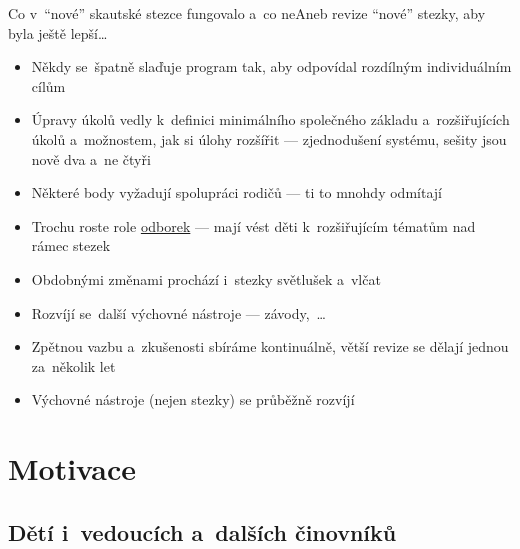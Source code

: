 \documentclass[compress, ucs, xelatex, 11pt, xcolor=dvipsnames, print, aspectratio=169,
	hyperref={
		bookmarks=true,
		unicode=true,
		colorlinks=true,
		pdftitle={Skautska vychovna metoda},
		plainpages=false,
		pdfauthor={Vojtech Zeisek},
		pdfsubject={Skautska vychovna metoda a jeji vyvoj za posledni stoleti a desetileti},
		pdfcreator={XeLaTeX},
		pdfkeywords={Junak, Pedagogika, Skaut, Skauting, Vychovna metoda},
		linkcolor=Red, %
		anchorcolor=ForestGreen, %
		citecolor=ForestGreen, %
		filecolor=ForestGreen, %
		menucolor=ForestGreen, %
		urlcolor=Sepia, %
		pdftex},
	url={hyphens, lowtilde} %
	]{beamer}
\begin{document}
\begin{frame}{Co v~\enquote{nové} skautské stezce fungovalo a~co ne}{Aneb revize \enquote{nové} stezky, aby byla ještě lepší\ldots}
	\begin{itemize}
		\item Někdy se~špatně slaďuje program tak, aby odpovídal rozdílným individuálním cílům
		\item Úpravy úkolů vedly k~definici minimálního společného základu a~rozšiřujících úkolů a~možnostem, jak si úlohy rozšířit --- zjednodušení systému, sešity jsou nově dva a~ne čtyři
		\item Některé body vyžadují spolupráci rodičů --- ti to mnohdy odmítají
		\item Trochu roste role \href{https://odborky.skaut.cz/}{odborek} --- mají vést děti k~rozšiřujícím tématům nad rámec stezek
		\item Obdobnými změnami prochází i~stezky světlušek a~vlčat
		\item Rozvíjí se~další výchovné nástroje --- závody,~\ldots
		\item Zpětnou vazbu a~zkušenosti sbíráme kontinuálně, větší revize se dělají jednou za~několik let
		\item Výchovné nástroje (nejen stezky) se průběžně rozvíjí
	\end{itemize}
\end{frame}

\section{Motivace}

\subsection{Dětí i~vedoucích a~dalších činovníků}
\end{document}
